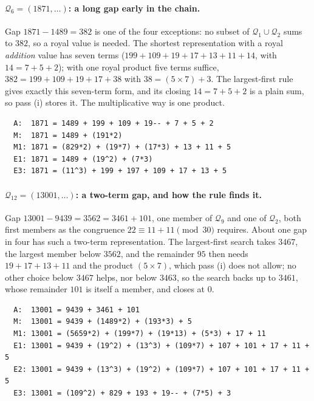 \documentclass[11pt,a4paper]{article}
\newcommand{\Q}{\mathcal{Q}}
\begin{document}
\paragraph{$\Q_6=(1871,\dots)$: a long gap early in the chain.}
Gap $1871-1489=382$ is one of the four exceptions: no subset of
$\Q_1\cup\Q_2$ sums to $382$, so a royal value is needed. The shortest
representation with a royal \emph{addition} value has seven terms
($199+109+19+17+13+11+14$, with $14=7+5+2$); with one royal product five
terms suffice, $382=199+109+19+17+38$ with $38=(5\times7)+3$.
The largest-first rule gives exactly this seven-term form, and its
closing $14=7+5+2$ is a plain sum, so pass (i) stores it. The multiplicative way is one
product.
\begin{small}\begin{verbatim}
  A:  1871 = 1489 + 199 + 109 + 19-- + 7 + 5 + 2
  M:  1871 = 1489 + (191*2)
  M1: 1871 = (829*2) + (19*7) + (17*3) + 13 + 11 + 5
  E1: 1871 = 1489 + (19^2) + (7*3)
  E3: 1871 = (11^3) + 199 + 197 + 109 + 17 + 13 + 5
\end{verbatim}\end{small}

\paragraph{$\Q_{12}=(13001,\dots)$: a two-term gap, and how the rule finds it.}
Gap $13001-9439=3562=3461+101$, one member of $\Q_9$ and one of $\Q_2$,
both first members as the congruence $22\equiv 11+11 \pmod{30}$ requires.
About one gap in four has such a two-term representation. The
largest-first search takes $3467$, the largest member below $3562$, and
the remainder $95$ then needs $19+17+13+11$ and the product $(5\times7)$,
which pass (i) does not allow; no other choice below $3467$ helps, nor
below $3463$, so the search backs up to $3461$, whose remainder $101$ is
itself a member, and closes at $0$.
\begin{small}\begin{verbatim}
  A:  13001 = 9439 + 3461 + 101
  M:  13001 = 9439 + (1489*2) + (193*3) + 5
  M1: 13001 = (5659*2) + (199*7) + (19*13) + (5*3) + 17 + 11
  E1: 13001 = 9439 + (19^2) + (13^3) + (109*7) + 107 + 101 + 17 + 11 + 5
  E2: 13001 = 9439 + (13^3) + (19^2) + (109*7) + 107 + 101 + 17 + 11 + 5
  E3: 13001 = (109^2) + 829 + 193 + 19-- + (7*5) + 3
\end{verbatim}\end{small}
\end{document}
